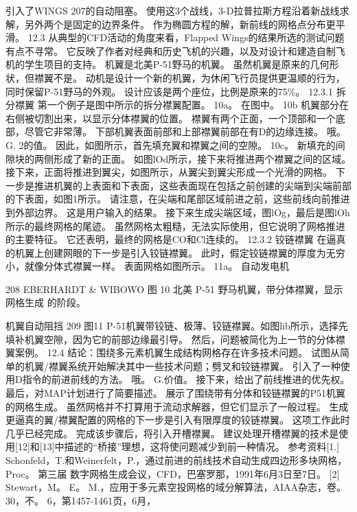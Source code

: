 \documentclass[UTF8,11pt,a4paper,openany,fontset=fandol]{ctexbook}
\begin{document}
引入了WINGS 207的自动阻塞。 使用这3个战线，3-D拉普拉斯方程沿着新战线求解，另外两个是固定的边界条件。 作为椭圆方程的解，新前线的网格点分布更平滑。 12.3 从典型的CFD活动的角度来看，Flapped Wings的结果所选的测试问题有点不寻常。 它反映了作者对经典和历史飞机的兴趣，以及对设计和建造自制飞机的学生项目的支持。 机翼是北美P-51野马的机翼。 虽然机翼是原来的几何形状，但襟翼不是。 动机是设计一个新的机翼，为休闲飞行员提供更温顺的行为，同时保留P-51野马的外观。 设计应该是两个座位，比例是原来的75\%。 12.3.1 拆分襟翼 第一个例子是图中所示的拆分襟翼配置。 10a。 在图中。 10b 机翼部分在右侧被切割出来，以显示分体襟翼的位置。 襟翼有两个正面，一个顶部和一个底部，尽管它非常薄。 下部机翼表面前部和上部襟翼前部在有D的边缘连接。 哦。 G. 2的值。 因此，如图所示，首先填充翼和襟翼之间的空隙。 10c。 新填充的间隙块的两侧形成了新的正面。 如图lOd所示，接下来将推进两个襟翼之间的区域。 接下来，正面将推进到翼尖，如图所示，从翼尖到翼尖形成一个光滑的网格。 下一步是推进机翼的上表面和下表面，这些表面现在包括之前创建的尖端到尖端前部的下表面，如图1所示。 请注意，在尖端和尾部区域前进之前，这些前线向前推进到外部边界。 这是用户输入的结果。 接下来生成尖端区域，图lOg，最后是图lOh所示的最终网格的尾迹。 虽然网格太粗糙，无法实际使用，但它说明了网格推进的主要特征。 它还表明，最终的网格是CO和Cl连续的。 12.3.2 铰链襟翼 在逼真的机翼上创建网眼的下一步是引入铰链襟翼。 此时，假定铰链襟翼的厚度为无穷小，就像分体式襟翼一样。 表面网格如图所示。 11a。 自动发电机

208 EBERHARDT \& WIBOWO 图 10 北美 P-51 野马机翼，带分体襟翼，显示 网格生成 的阶段。

机翼自动阻挡 209 图11 P-51机翼带铰链、极薄、铰链襟翼。如图lib所示，选择先填补机翼空隙，因为它的前部边缘最引导。 然后，问题被简化为上一节的分体襟翼案例。 12.4 结论：围绕多元素机翼生成结构网格存在许多技术问题。 试图从简单的机翼/襟翼系统开始解决其中一些技术问题；劈叉和铰链襟翼。 引入了一种使用D指令的前进前线的方法。 哦。 G.价值。 接下来，给出了前线推进的优先权。 最后，对MAP计划进行了简要描述。 展示了围绕带有分体和铰链襟翼的P51机翼的网格生成。 虽然网格并不打算用于流动求解器，但它们显示了一般过程。 生成更逼真的翼/襟翼配置的网格的下一步是引入有限厚度的铰链襟翼。 这项工作此时几乎已经完成。 完成该步骤后，将引入开槽襟翼。 建议处理开槽襟翼的技术是使用[12]和[13]中描述的“桥接”理想，这将使问题减少到前一种情况。 参考资料[1.] Schonfeld，T.和Weinerfelt，P.，通过前进的前线技术自动生成四边形多块网格，Proc。 第三届 数字网格生成会议，CFD，巴塞罗那，1991年6月3日至7日。 [2] Stewart，M。 E。 M.，应用于多元素空投网格的域分解算法，AIAA杂志，卷。 30，不。 6，第1457-1461页，6月，
\end{document}
